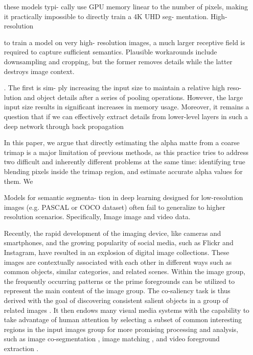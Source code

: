 \documentclass[sigconf]{acmart}
\begin{document}
these models typi- cally use GPU memory linear to the number of pixels, making it practically impossible to directly train a 4K UHD seg- mentation. High-resolution


to train a model on very high- resolution images, a much larger receptive field is required to capture sufficient semantics. Plausible workarounds include downsampling and cropping, but the former removes details while the latter destroys image context.

. The first is sim- ply increasing the input size to maintain a relative high reso- lution and object details after a series of pooling operations. However, the large input size results in significant increases
in memory usage. Moreover, it remains a question that if we can effectively extract details from lower-level layers in such a deep network through back propagation

In this paper, we argue that directly estimating the alpha matte from a coarse trimap is a major limitation of previous methods, as this practice tries to address two difficult and inherently different problems at the same time: identifying true blending pixels inside the trimap region, and estimate accurate alpha values for them. We

Models for semantic segmenta- tion in deep learning designed for low-resolution images (e.g. PASCAL or COCO dataset) often fail to generalize to higher resolution scenarios. Specifically,
Image 
image and video data. 

Recently, the rapid development of the imaging device, like cameras and smartphones, and the growing popularity of social media, such as Flickr and Instagram, have resulted in an explosion of digital image collections. These images are contextually associated with each other in different ways such as common objects, similar categories, and related scenes. Within the image group, the frequently occurring patterns or the prime foregrounds can be utilized to represent the main content of the image group.  The co-saliency task is thus derived with the goal of discovering consistent salient objects in a group of related images \cite{Cheng2014}.  It then endows many visual media systems with the capability to take advantage of human attention by selecting a subset of common interesting regions in the input images group for more promising processing and analysis, such as image co-segmentation \cite{DBLP:conf/cvpr/ChangLL11}, image matching \cite{Xue2013}, and video foreground extraction \cite{Zhang2012}. 
\end{document}

